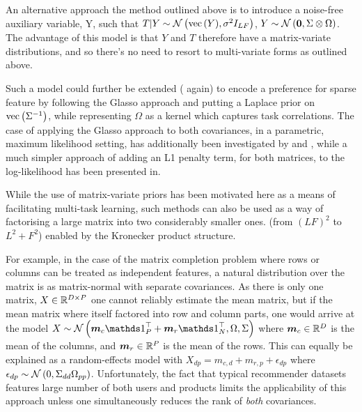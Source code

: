 

An alternative approach the method outlined above is to introduce a noise-free auxiliary variable, Y, such that $T|Y\sim\mathcal{N} \left( {\text{vec}\left(Y\right)}, {\sigma^2 I_{LF}} \right)$, $Y\sim\mathcal{N} \left( {\bm 0}, {\Sigma \otimes \Omega} \right)$\cite{Stegle2011}. The advantage of this model is that $Y$ and $T$ therefore have a matrix-variate distributions, and so there's no need to resort to multi-variate forms as outlined above. 

Such a model could further be extended (\cite{Stegle2011} again) to encode a preference for sparse feature by following the Glasso approach\cite{Friedman2008} and putting a Laplace prior on $\text{vec}\left({\Sigma}^{-1}\right)$, while representing $\Omega$ as a kernel which captures task correlations. The case of applying the Glasso approach to both covariances, in a parametric, maximum likelihood setting, has additionally been investigated by \cite{Tsiligkaridis2012b} and \cite{Tsiligkaridis2012}, while a much simpler approach of adding an L1 penalty term, for both matrices, to the log-likelihood has been presented in\cite{Zhang2010a}.


While the use of matrix-variate priors has been motivated here as a means of facilitating multi-task learning, such methods can also be used as a way of factorising a large matrix into two considerably smaller ones. (from $(LF)^2$ to $L^2 + F^2$) enabled by the Kronecker product structure.

For example, in the case of the matrix completion problem where rows or columns can be treated as independent features, a natural distribution over the matrix is as matrix-normal with separate covariances. As there is only one matrix, $X \in { \mathbb{R}^{D \times P} }$ one cannot reliably estimate the mean matrix, but if the mean matrix where itself factored into row and column parts, one would arrive at the model\cite{Allen2010}  $X \sim \mnor{\vv{m}_c \one_P\T + \vv{m}_r \one_N\T}{\Omega}{\Sigma}$ where $\bm m_c \in { \mathbb{R}^{D} }$ is the mean of the columns, and $\bm m_r \in { \mathbb{R}^{P} }$ is the mean of the rows. This can equally be explained as a random-effects model with $X_{dp} = m_{c,d} + m_{r,p} + \epsilon_{dp}$ where $\epsilon_{dp} \sim \mathcal{N} \left( {0}, {\Sigma_{dd}\Omega_{pp}} \right)$. Unfortunately, the fact that typical recommender datasets features large number of both users and products limits the applicability of this approach unless one simultaneously reduces the rank of \emph{both} covariances.


